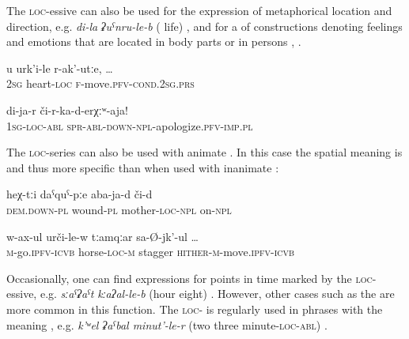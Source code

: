 The \textsc{loc}-essive can also be used for the expression of metaphorical location and direction, e.g. \textit{di-la} \textit{ʡuˁnru-le-b} ( life) , and for a  of constructions denoting feelings and emotions that are located in body parts or in persons , .
%
\begin{exe}
	\ex	\label{ex:when I remember you,}
	\gll	u	urk'i-le	r-ak'-utːe, \ldots\\
		2\textsc{sg}	heart-\textsc{loc}	\textsc{f}-move.\textsc{pfv}-\textsc{cond}.2\textsc{sg}.\textsc{prs}\\
	\glt	{}

	\ex	\label{ex:forgive me}
	\gll	di-ja-r	či-r-ka-d-erχːʷ-aja! \\
		1\textsc{sg}-\textsc{loc}-\textsc{abl}	\textsc{spr}-\textsc{abl-down}-\textsc{npl}-apologize.\textsc{pfv}-\textsc{imp}.\textsc{pl}\\
	\glt	{}
\end{exe}

The \textsc{loc-}series can also be used with animate . In this case the spatial meaning is  and thus more specific than when used with inanimate :

\begin{exe}
	\ex	\label{ex:these wounds on the mother}
	\gll	heχ-tːi	daˁquˁ-pːe	aba-ja-d	či-d \\
		\textsc{dem.down}-\textsc{pl}	wound-\textsc{pl}	mother-\textsc{loc}-\textsc{npl}	on-\textsc{npl}\\
	\glt	{}

	\ex	\label{ex:(he was) riding on a horse and shaking}
	\gll	w-ax-ul	urči-le-w	tːamqːar	sa-Ø-jk'-ul	\ldots\\
		\textsc{m}-go.\textsc{ipfv}-\textsc{icvb}	horse-\textsc{loc}-\textsc{m}	stagger	\textsc{hither}-\textsc{m}-move.\textsc{ipfv}-\textsc{icvb}\\
	\glt	{}
\end{exe}

Occasionally, one can find expressions for points in time marked by the \textsc{loc}-essive, e.g. \textit{sːaˁʡaˁt} \textit{kːaʔal-le-b} (hour eight) . However, other cases such as the  are more common in this function. The \textsc{loc}- is regularly used in phrases with the meaning , e.g. \textit{k'ʷel ʡaˁbal minut'-le-r} (two three minute-\textsc{loc-abl}) .

